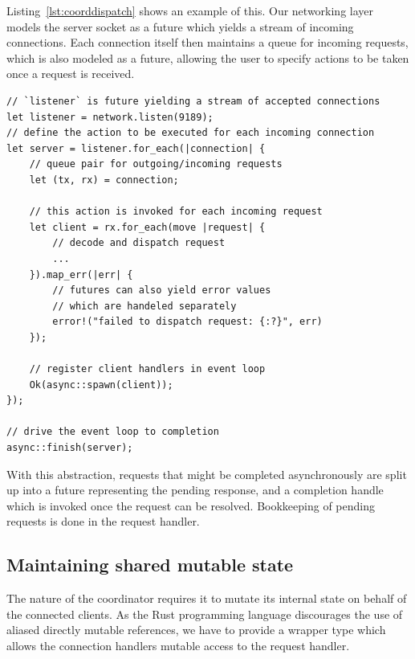 Listing~\ref{lst:coorddispatch} shows an example of this. Our networking layer
models the server socket as a future which yields a stream of incoming connections.
Each connection itself then maintains a queue for incoming requests, which is
also modeled as a future, allowing the user to specify actions to be taken
once a request is received.

\begin{lstlisting}[caption={[Connection handling at the coordinator]%
Accepting and dispatching incoming connections. The actions specified
in \lstinline{for_each} and \lstinline{map_err} are invoked by the
event loop if the corresponding events (such as new incoming connections,
new incoming requests or errors during request handling) occur.},label={lst:coorddispatch}]
// `listener` is future yielding a stream of accepted connections
let listener = network.listen(9189);
// define the action to be executed for each incoming connection
let server = listener.for_each(|connection| {
    // queue pair for outgoing/incoming requests
    let (tx, rx) = connection;
   
    // this action is invoked for each incoming request
    let client = rx.for_each(move |request| {
        // decode and dispatch request 
        ...
    }).map_err(|err| {
        // futures can also yield error values
        // which are handeled separately
        error!("failed to dispatch request: {:?}", err)
    });

    // register client handlers in event loop
    Ok(async::spawn(client));
});

// drive the event loop to completion
async::finish(server);
\end{lstlisting}




With this abstraction, requests that might be completed asynchronously
are split up into a future representing the pending response, and a completion handle
which is invoked once the request can be resolved. Bookkeeping of pending requests
is done in the request handler.



\subsection{Maintaining shared mutable state}

The nature of the coordinator requires it to mutate its internal state on
behalf of the connected clients. As the Rust programming language discourages
the use of aliased directly mutable references, we have to provide a wrapper
type which allows the connection handlers mutable access to the request handler.

